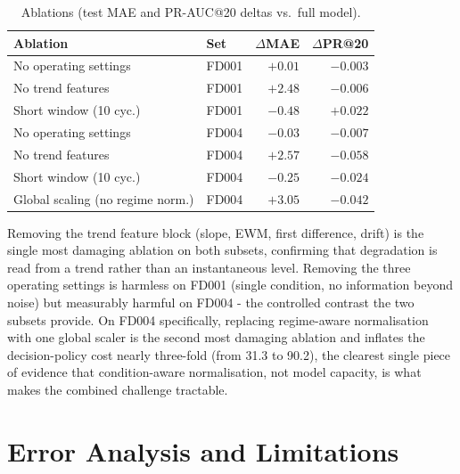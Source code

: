 \documentclass[9pt,a4paper,twocolumn,twoside]{rho-class/rho}
\begin{document}
        \begin{table}[H]
            \caption{Ablations (test MAE and PR-AUC@20 deltas vs.\ full model).}
            \label{tab:ablation}
            \begin{tabular}{
                >{\raggedright\arraybackslash}p{}
                >{\raggedright\arraybackslash}p{}
                rr
            }
            \toprule
            \textbf{Ablation} & \textbf{Set} & $\Delta$\textbf{MAE} & $\Delta$\textbf{PR@20} \\
            \midrule
            No operating settings   & FD001 & $+0.01$ & $-0.003$ \\
            No trend features       & FD001 & $+2.48$ & $-0.006$ \\
            Short window (10 cyc.)  & FD001 & $-0.48$ & $+0.022$ \\
            No operating settings   & FD004 & $-0.03$ & $-0.007$ \\
            No trend features       & FD004 & $+2.57$ & $-0.058$ \\
            Short window (10 cyc.)  & FD004 & $-0.25$ & $-0.024$ \\
            Global scaling (no regime norm.) & FD004 & $+3.05$ & $-0.042$ \\
            \bottomrule
            \end{tabular}
        \end{table}

        Removing the trend feature block (slope, EWM, first difference, drift) is the single most damaging ablation on both subsets, confirming that degradation is read from a trend rather than an instantaneous level. Removing the three operating settings is harmless on FD001 (single condition, no information beyond noise) but measurably harmful on FD004 - the controlled contrast the two subsets provide. On FD004 specifically, replacing regime-aware normalisation with one global scaler is the second most damaging ablation and inflates the decision-policy cost nearly three-fold (from 31.3 to 90.2), the clearest single piece of evidence that condition-aware normalisation, not model capacity, is what makes the combined challenge tractable.

\section{Error Analysis and Limitations}
\end{document}
